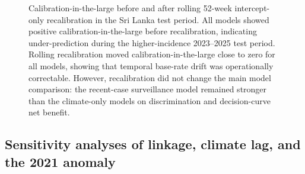 \documentclass[11pt,a4paper]{article}
\begin{document}
\begin{figure}[H]
\centering
{}


\caption{
Calibration-in-the-large before and after rolling 52-week intercept-only recalibration
in the Sri Lanka test period. All models showed positive calibration-in-the-large before
recalibration, indicating under-prediction during the higher-incidence 2023--2025 test
period. Rolling recalibration moved calibration-in-the-large close to zero for all models,
showing that temporal base-rate drift was operationally correctable. However, recalibration
did not change the main model comparison: the recent-case surveillance model remained
stronger than the climate-only models on discrimination and decision-curve net benefit.
}

\label{fig:srilanka-calibration}
\end{figure}









\subsection{Sensitivity analyses of linkage, climate lag, and the 2021 anomaly}
\label{subsec:sensitivity-analyses}
\end{document}
